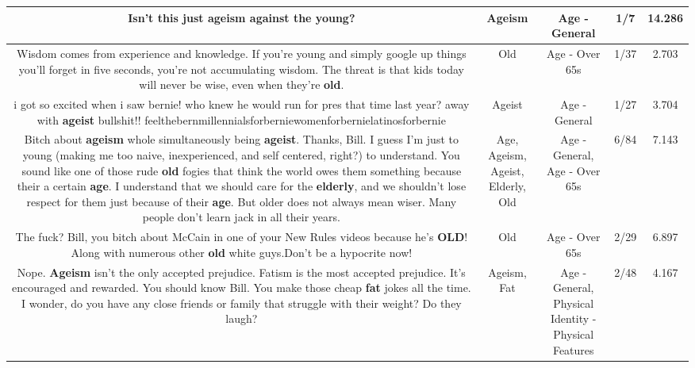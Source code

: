 \documentclass[11pt]{article}
\newlength\mylength
\begin{document}
\begin{center}
\begin{longtable}{|C{.65\mylength}|C{.30\mylength}|C{.12\mylength}|C{.12\mylength}|C{.12\mylength}|}
  \small Isn't this just \textbf{ageism} against the young?\normalsize   & Ageism & Age - General & 1/7 & 14.286 \\  \hline
  \small Wisdom comes from experience and knowledge. If you're young and simply google up things you'll forget in five seconds, you're not accumulating wisdom. The threat is that kids today will never be wise, even when they're \textbf{old}.\normalsize   & Old & Age - Over 65s & 1/37 & 2.703 \\  \hline
  \small i got so excited when i saw bernie! who knew he would run for pres that time last year? away with \textbf{ageist} bullshit!! feelthebernmillennialsforberniewomenforbernielatinosforbernie\normalsize   & Ageist & Age - General & 1/27 & 3.704 \\  \hline
  \small Bitch about \textbf{ageism} whole simultaneously being \textbf{ageist}. Thanks, Bill. I guess I'm just to young (making me too naive, inexperienced, and self centered, right?) to understand. You sound like one of those rude \textbf{old} fogies that think the world owes them something because their a certain \textbf{age}. I understand that we should care for the \textbf{elderly}, and we shouldn't lose respect for them just because of their \textbf{age}. But older does not always mean wiser. Many people don't learn jack in all their years.\normalsize   & Age, Ageism, Ageist, Elderly, Old & Age - General, Age - Over 65s & 6/84 & 7.143 \\  \hline
  \small The fuck?  Bill, you bitch about McCain in one of your New Rules videos because he's \textbf{OLD}!  Along with numerous other \textbf{old} white guys.Don't be a hypocrite now!\normalsize   & Old & Age - Over 65s & 2/29 & 6.897 \\  \hline
  \small Nope. \textbf{Ageism} isn't the only accepted prejudice. Fatism is the most accepted prejudice. It's encouraged and rewarded. You should know Bill. You make those cheap \textbf{fat} jokes all the time. I wonder, do you have any close friends or family that struggle with their weight? Do they laugh?\normalsize   & Ageism, Fat & Age - General, Physical Identity - Physical Features & 2/48 & 4.167 \\  \hline

\end{longtable}
\end{center}
\end{document}
